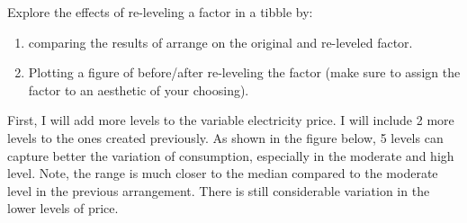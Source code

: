 \documentclass[]{article}
\newenvironment{Shaded}{\begin{snugshade}}{\end{snugshade}}
\newcommand{\CommentTok}[1]{\textcolor[rgb]{0.56,0.35,0.01}{\textit{#1}}}
\newcommand{\DataTypeTok}[1]{\textcolor[rgb]{0.13,0.29,0.53}{#1}}
\newcommand{\DecValTok}[1]{\textcolor[rgb]{0.00,0.00,0.81}{#1}}
\newcommand{\FloatTok}[1]{\textcolor[rgb]{0.00,0.00,0.81}{#1}}
\newcommand{\KeywordTok}[1]{\textcolor[rgb]{0.13,0.29,0.53}{\textbf{#1}}}
\newcommand{\NormalTok}[1]{#1}
\newcommand{\OperatorTok}[1]{\textcolor[rgb]{0.81,0.36,0.00}{\textbf{#1}}}
\newcommand{\OtherTok}[1]{\textcolor[rgb]{0.56,0.35,0.01}{#1}}
\newcommand{\StringTok}[1]{\textcolor[rgb]{0.31,0.60,0.02}{#1}}
\providecommand{\tightlist}{%
  \setlength{\itemsep}{0pt}\setlength{\parskip}{0pt}}
\begin{document}
Explore the effects of re-leveling a factor in a tibble by:

\begin{enumerate}
\def\labelenumi{\arabic{enumi}.}
\tightlist
\item
  comparing the results of arrange on the original and re-leveled
  factor.
\item
  Plotting a figure of before/after re-leveling the factor (make sure to
  assign the factor to an aesthetic of your choosing).
\end{enumerate}

First, I will add more levels to the variable electricity price. I will
include 2 more levels to the ones created previously. As shown in the
figure below, 5 levels can capture better the variation of consumption,
especially in the moderate and high level. Note, the range is much
closer to the median compared to the moderate level in the previous
arrangement. There is still considerable variation in the lower levels
of price.

\begin{Shaded}
\end{Shaded}
\end{document}
